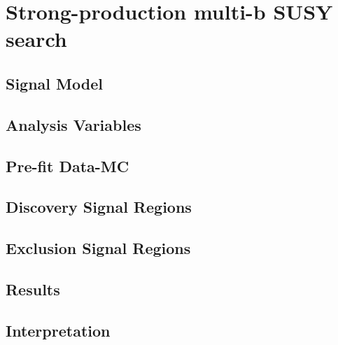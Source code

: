 \chapter{Strong-production multi-b SUSY search}
\label{chap:strong_prod}


\section{Signal Model}

\section{Analysis Variables}


\section{Pre-fit Data-MC}


\section{Discovery Signal Regions}


\section{Exclusion Signal Regions}


\section{Results}


\section{Interpretation}